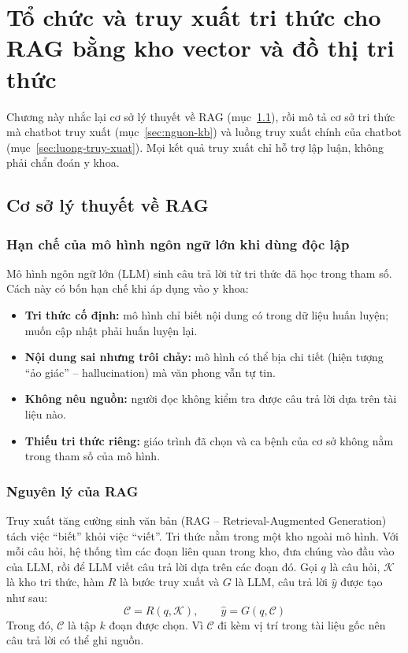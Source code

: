 \chapter[\MakeUppercase{Tổ chức và truy xuất tri thức cho RAG bằng kho vector và đồ thị tri thức}]{Tổ chức và truy xuất tri thức cho RAG bằng kho vector và đồ thị tri thức}
\label{ch:chuong4}

Chương này nhắc lại cơ sở lý thuyết về RAG (mục~\ref{sec:ly-thuyet-rag}), rồi mô tả cơ sở tri thức mà chatbot truy xuất (mục~\ref{sec:nguon-kb}) và luồng truy xuất chính của chatbot (mục~\ref{sec:luong-truy-xuat}). Mọi kết quả truy xuất chỉ hỗ trợ lập luận, không phải chẩn đoán y khoa.

\section{Cơ sở lý thuyết về RAG}
\label{sec:ly-thuyet-rag}

\subsection{Hạn chế của mô hình ngôn ngữ lớn khi dùng độc lập}

Mô hình ngôn ngữ lớn (LLM) sinh câu trả lời từ tri thức đã học trong tham số. Cách này có bốn hạn chế khi áp dụng vào y khoa:
\begin{itemize}
  \item \textbf{Tri thức cố định:} mô hình chỉ biết nội dung có trong dữ liệu huấn luyện; muốn cập nhật phải huấn luyện lại.
  \item \textbf{Nội dung sai nhưng trôi chảy:} mô hình có thể bịa chi tiết (hiện tượng ``ảo giác'' -- hallucination) mà văn phong vẫn tự tin.
  \item \textbf{Không nêu nguồn:} người đọc không kiểm tra được câu trả lời dựa trên tài liệu nào.
  \item \textbf{Thiếu tri thức riêng:} giáo trình đã chọn và ca bệnh của cơ sở không nằm trong tham số của mô hình.
\end{itemize}

\subsection{Nguyên lý của RAG}

Truy xuất tăng cường sinh văn bản (RAG -- Retrieval-Augmented Generation) tách việc ``biết'' khỏi việc ``viết''. Tri thức nằm trong một kho ngoài mô hình. Với mỗi câu hỏi, hệ thống tìm các đoạn liên quan trong kho, đưa chúng vào đầu vào của LLM, rồi để LLM viết câu trả lời dựa trên các đoạn đó. Gọi $q$ là câu hỏi, $\mathcal{K}$ là kho tri thức, hàm $R$ là bước truy xuất và $G$ là LLM, câu trả lời $\hat{y}$ được tạo như sau:
\begin{equation}
\mathcal{C} = R(q, \mathcal{K}), \qquad \hat{y} = G(q, \mathcal{C})
\label{eq:rag-tong-quat}
\end{equation}
Trong đó, $\mathcal{C}$ là tập $k$ đoạn được chọn. Vì $\mathcal{C}$ đi kèm vị trí trong tài liệu gốc nên câu trả lời có thể ghi nguồn.

